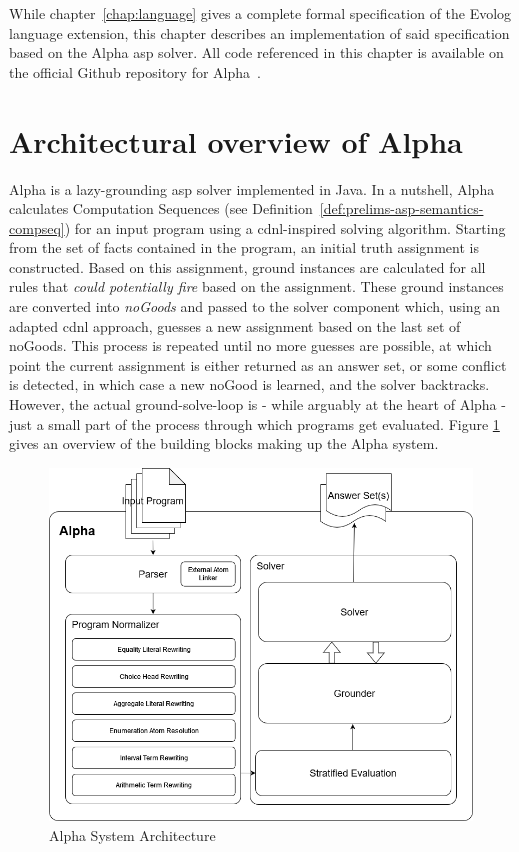 While chapter~\ref{chap:language} gives a complete formal specification of the Evolog language extension, this chapter describes an implementation of said specification based on the Alpha \gls{asp} solver. All code referenced in this chapter is available on the official Github repository for Alpha~\cite{evolog-pr}.

\section{Architectural overview of Alpha}
\label{sec:alpha-arch-overview}

Alpha is a lazy-grounding \gls{asp} solver implemented in Java. In a nutshell, Alpha calculates Computation Sequences (see Definition~\ref{def:prelims-asp-semantics-compseq}) for an input program using a \gls{cdnl}-inspired solving algorithm. Starting from the set of facts contained in the program, an initial truth assignment is constructed. Based on this assignment, ground instances are calculated for all rules that \emph{could potentially fire} based on the assignment. These ground instances are converted into \emph{noGoods} and passed to the solver component which, using an adapted \gls{cdnl} approach, guesses a new assignment based on the last set of noGoods. This process is repeated until no more guesses are possible, at which point the current assignment is either returned as an answer set, or some conflict is detected, in which case a new noGood is learned, and the solver backtracks. However, the actual ground-solve-loop is - while arguably at the heart of Alpha - just a small part of the process through which programs get evaluated. Figure \ref{fig:alpha-arch} gives an overview of the building blocks making up the Alpha system.

\begin{figure}[t]
    \includegraphics[width=\linewidth]{graphics/alpha-architecture.drawio.png}
    \caption{Alpha System Architecture}
    \label{fig:alpha-arch}
\end{figure}

